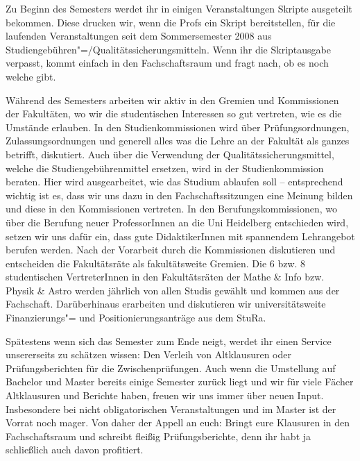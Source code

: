 Zu Beginn des Semesters werdet ihr in einigen Veranstaltungen Skripte ausgeteilt bekommen. Diese drucken wir, wenn die Profs ein Skript bereitstellen, für die laufenden Veranstaltungen seit dem Sommersemester 2008 aus Studiengebühren"=/Qualitätssicherungsmitteln. Wenn ihr die Skriptausgabe verpasst, kommt einfach in den Fachschaftsraum und fragt nach, ob es noch welche gibt.

Während des Semesters arbeiten wir aktiv in den Gremien und Kommissionen der Fakultäten, wo wir die studentischen Interessen so gut vertreten, wie es die Umstände erlauben. In den Studienkommissionen wird über Prüfungsordnungen, Zulassungsordnungen und generell alles was die Lehre an der Fakultät als ganzes betrifft, diskutiert. Auch über die Verwendung der Qualitätssicherungsmittel, welche die Studiengebührenmittel ersetzen, wird in der Studienkommission beraten. Hier wird ausgearbeitet, wie das Studium ablaufen soll -- entsprechend wichtig ist es, dass wir uns dazu in den Fachschaftssitzungen eine Meinung bilden und diese in den Kommissionen vertreten. In den Berufungskommissionen, wo über die Berufung neuer ProfessorInnen an die Uni Heidelberg entschieden wird, setzen wir uns dafür ein, dass gute DidaktikerInnen mit spannendem Lehrangebot berufen werden. Nach der Vorarbeit durch die Kommissionen diskutieren und entscheiden die Fakultätsräte als fakultätsweite Gremien. Die 6 bzw. 8 studentischen VertreterInnen in den Fakultätsräten der Mathe \& Info bzw. Physik \& Astro werden jährlich von allen Studis gewählt und kommen aus der Fachschaft. Darüberhinaus erarbeiten und diskutieren wir universitätsweite Finanzierungs"= und Positionierungsanträge aus dem \gls{StuRa}.

Spätestens wenn sich das Semester zum Ende neigt, werdet ihr einen Service unsererseits zu schätzen wissen: Den Verleih von Altklausuren oder Prüfungsberichten für die Zwischenprüfungen. Auch wenn die Umstellung auf Bachelor und Master bereits einige Semester zurück liegt und wir für viele Fächer Altklausuren und Berichte haben, freuen wir uns immer über neuen Input. Insbesondere bei nicht obligatorischen Veranstaltungen und im Master ist der Vorrat noch mager. Von daher der Appell an euch: Bringt eure Klausuren in den Fachschaftsraum und schreibt fleißig Prüfungsberichte, denn ihr habt ja schließlich auch davon profitiert.


